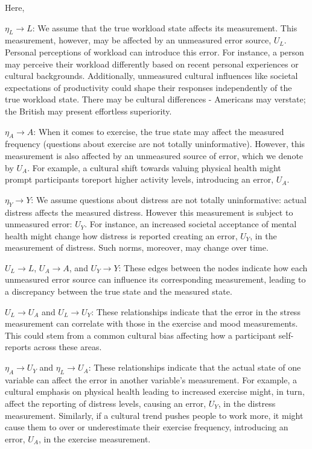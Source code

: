 \documentclass[
  singlecolumn]{report}
\begin{document}
Here,

\(\eta_L \rightarrow L\): We assume that the true workload state affects
its measurement. This measurement, however, may be affected by an
unmeasured error source, \(U_{L}\). Personal perceptions of workload can
introduce this error. For instance, a person may perceive their workload
differently based on recent personal experiences or cultural
backgrounds. Additionally, unmeasured cultural influences like societal
expectations of productivity could shape their responses independently
of the true workload state. There may be cultural differences -
Americans may verstate; the British may present effortless superiority.

\(\eta_A \rightarrow A\): When it comes to exercise, the true state may
affect the measured frequency (questions about exercise are not totally
uninformative). However, this measurement is also affected by an
unmeasured source of error, which we denote by \(U_{A}\). For example, a
cultural shift towards valuing physical health might prompt participants
toreport higher activity levels, introducing an error, \(U_{A}\).

\(\eta_Y \rightarrow Y\): We assume questions about distress are not
totally uninformative: actual distress affects the measured distress.
However this measurement is subject to unmeasured error: \(U_{Y}\). For
instance, an increased societal acceptance of mental health might change
how distress is reported creating an error, \(U_{Y}\), in the
measurement of distress. Such norms, moreover, may change over time.

\(U_{L} \rightarrow L\), \(U_{A} \rightarrow A\), and
\(U_{Y} \rightarrow Y\): These edges between the nodes indicate how each
unmeasured error source can influence its corresponding measurement,
leading to a discrepancy between the true state and the measured state.

\(U_{L} \rightarrow U_{A}\) and \(U_{L} \rightarrow U_{Y}\): These
relationships indicate that the error in the stress measurement can
correlate with those in the exercise and mood measurements. This could
stem from a common cultural bias affecting how a participant
self-reports across these areas.

\(\eta_A \rightarrow U_{Y}\) and \(\eta_L \rightarrow U_{A}\): These
relationships indicate that the actual state of one variable can affect
the error in another variable's measurement. For example, a cultural
emphasis on physical health leading to increased exercise might, in
turn, affect the reporting of distress levels, causing an error,
\(U_{Y}\), in the distress measurement. Similarly, if a cultural trend
pushes people to work more, it might cause them to over or underestimate
their exercise frequency, introducing an error, \(U_{A}\), in the
exercise measurement.
\end{document}
